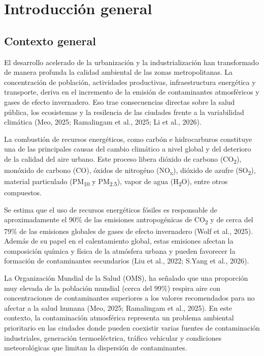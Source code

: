\chapter{Introducción general}
\section{Contexto general}

El desarrollo acelerado de la urbanización y la industrialización 
han transformado de manera profunda la calidad ambiental de las
zonas metropolitanas. La concentración de población, actividades
productivas, infraestructura energética y transporte, deriva en 
el incremento de la emisión de contaminantes atmosféricos y gases
de efecto invernadero. Eso trae consecuencias directas sobre la 
salud pública, los ecosistemas y la resilencia de las ciudades
frente a la variabilidad climática (Meo, 2025; Ramalingam 
et al., 2025; Li et al., 2026).

La combustión de recursos energéticos, como carbón e hidrocarburos 
constituye una de las principales 
causas del cambio climático a nivel global y del deterioro de la calidad del 
aire urbano. Este proceso libera dióxido de carbono (CO\textsubscript{2}),
monóxido de carbono (CO), óxidos de nitrogéno (NO\textsubscript{x}),
dióxido de azufre (SO\textsubscript{2}), material particulado 
(PM\textsubscript{10} y PM\textsubscript{2.5}), vapor de agua 
(H\textsubscript{2}O), entre otros compuestos. 

Se estima que el uso de recursos energéticos fósiles es responsable de 
aproximadamente el 90\% de las emisiones antropogénicas de 
CO\textsubscript{2} y de cerca del 79\% de las emisiones 
globales de gases de efecto invernadero (Wolf et al., 2025). 
Además de su papel en el calentamiento global, estas emisiones
afectan la composición química y física de la atmósfera urbana 
y pueden favorecer la formación de contaminantes secundarios
(Liu et al., 2022; S.Yang et al., 2026).

La Organización Mundial de la Salud (OMS), ha señalado que una 
proporción muy elevada de la población mundial
(cerca del 99\%) respira aire con concentraciones de contaminantes
superiores a los valores recomendados para no afectar a la salud humana
(Meo, 2025; Ramalingam et al., 2025). En este contexto, 
la contaminación atmosférica representa un problema ambiental 
prioritario en las ciudades donde pueden coexistir varias fuentes
de contaminación industriales, 
generación termoeléctrica, tráfico vehicular y condiciones meteorológicas 
que limitan la dispersión de contaminantes. 

